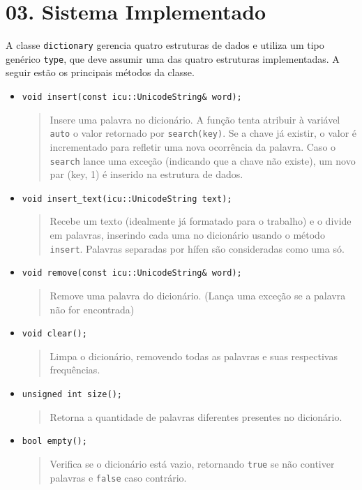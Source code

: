 \documentclass{article}
\begin{document}
\section*{03. Sistema Implementado}
A classe \texttt{dictionary} gerencia quatro estruturas de dados e utiliza um tipo genérico \texttt{type}, que deve assumir uma das quatro estruturas implementadas. A seguir estão os principais métodos da classe.
\begin{itemize}
    \item \texttt{void insert(const icu::UnicodeString\& word);}
    \begin{quote}
        Insere uma palavra no dicionário. A função tenta atribuir à variável \texttt{auto} o valor retornado por \texttt{search(key)}. Se a chave já existir, o valor é incrementado para refletir uma nova ocorrência da palavra. Caso o \texttt{search} lance uma exceção (indicando que a chave não existe), um novo par (key, 1) é inserido na estrutura de dados.
    \end{quote}

    \item \texttt{void insert\_text(icu::UnicodeString text);}
    \begin{quote}
        Recebe um texto (idealmente já formatado para o trabalho) e o divide em palavras, inserindo cada uma no dicionário usando o método \texttt{insert}. Palavras separadas por hífen são consideradas como uma só.
    \end{quote}

    \item \texttt{void remove(const icu::UnicodeString\& word);}
    \begin{quote}
        Remove uma palavra do dicionário. (Lança uma exceção se a palavra não for encontrada)
    \end{quote}

    \item \texttt{void clear();}
    \begin{quote}
        Limpa o dicionário, removendo todas as palavras e suas respectivas frequências.
    \end{quote}

    \item \texttt{unsigned int size();}
    \begin{quote}
        Retorna a quantidade de palavras diferentes presentes no dicionário.
    \end{quote}

    \item \texttt{bool empty();}
    \begin{quote}
        Verifica se o dicionário está vazio, retornando \texttt{true} se não contiver palavras e \texttt{false} caso contrário.
    \end{quote}


\end{itemize}
\end{document}
